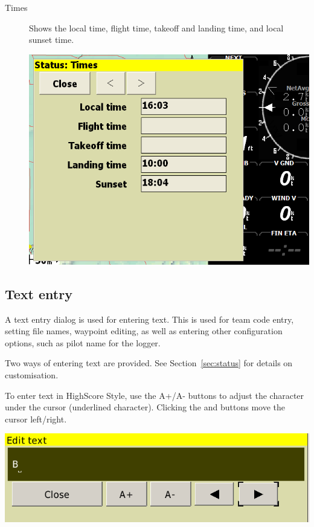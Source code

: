 \documentclass[a4paper,12pt]{refrep}
\begin{document}
\begin{description}
\item[Times]  Shows the local time, flight time, takeoff and landing time,
  and local sunset time.

\begin{center}
\includegraphics[angle=0,width=\linewidth,keepaspectratio='true']{figures/status-times.png}
\end{center}

\end{description}

\subsection*{Text entry}

A text entry dialog is used for entering text.  This is used for team
code entry, setting file names, waypoint editing, as well as entering
other configuration options, such as pilot name for the logger.

Two ways of entering text are provided. See Section~\ref{sec:status} for details on customisation.

To enter text in HighScore Style, use the A+/A- buttons to adjust the character under the
cursor (underlined character). Clicking the \button{$<$} and \button{$>$} buttons move the
cursor left/right.  

\begin{center}
\includegraphics[angle=0,width=\linewidth,keepaspectratio='true']{figures/textentry.png}
\end{center}
\end{document}
